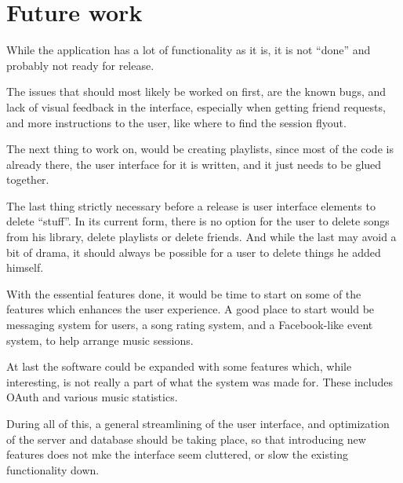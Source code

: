 \section{Future work}
While the application has a lot of functionality as it is, it is not ``done'' and probably not ready
for release.

The issues that should most likely be worked on first, are the known bugs, and lack of visual feedback
in the interface, especially when getting friend requests, and more instructions to the user, like
where to find the session flyout.

The next thing to work on, would be creating playlists, since most of the code is already there, the
user interface for it is written, and it just needs to be glued together.

The last thing strictly necessary before a release is user interface elements to delete ``stuff''.
In its current form, there is no option for the user to delete songs from his library, delete playlists
or delete friends. And while the last may avoid a bit of drama, it should always be possible for
a user to delete things he added himself.

With the essential features done, it would be time to start on some of the features which enhances
the user experience. A good place to start would be messaging system for users, a song rating
system, and a Facebook-like event system, to help arrange music sessions.

At last the software could be expanded with some features which, while interesting, is not really
a part of what the system was made for. These includes OAuth and various music statistics.

During all of this, a general streamlining of the user interface, and optimization of the server and
database should be taking place, so that introducing new features does not mke the interface seem
cluttered, or slow the existing functionality down.